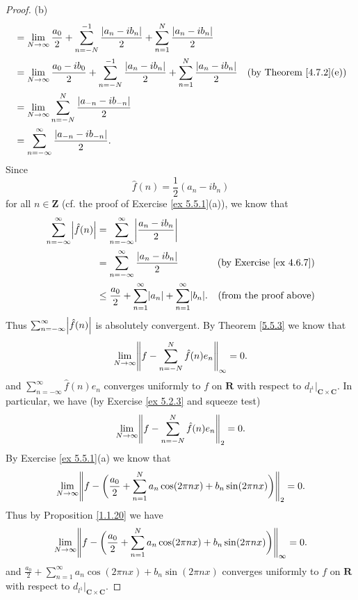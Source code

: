 \begin{proof}{(b)}
\begin{align*}
         & = \lim_{N \to \infty} \frac{a_0}{2} + \sum_{n = -N}^{-1} \frac{\abs*{a_n - i b_n}}{2} + \sum_{n = 1}^N \frac{\abs*{a_n - i b_n}}{2}                                                           \\
         & = \lim_{N \to \infty} \frac{a_0 - i b_0}{2} + \sum_{n = -N}^{-1} \frac{\abs*{a_n - i b_n}}{2} + \sum_{n = 1}^N \frac{\abs*{a_n - i b_n}}{2} & \text{(by Theorem \ref{4.7.2}(e))}              \\
         & = \lim_{N \to \infty} \sum_{n = -N}^N \frac{\abs*{a_{-n} - i b_{-n}}}{2}                                                                                                                      \\
         & = \sum_{n = -\infty}^\infty \frac{\abs*{a_{-n} - i b_{-n}}}{2}.
    \end{align*}
    Since
    \[
        \hat{f}(n) = \frac{1}{2} (a_n - i b_n)
    \]
    for all \(n \in \mathbf{Z}\) (cf. the proof of Exercise \ref{ex 5.5.1}(a)), we know that
    \begin{align*}
        \sum_{n = -\infty}^\infty \abs*{\hat{f}(n)} & = \sum_{n = -\infty}^\infty \abs*{\frac{a_n - i b_n}{2}}                                                                    \\
                                                    & = \sum_{n = -\infty}^\infty \frac{\abs*{a_n - i b_n}}{2}                              & \text{(by Exercise \ref{ex 4.6.7})} \\
                                                    & \leq \frac{a_0}{2} + \sum_{n = 1}^\infty \abs*{a_n} + \sum_{n = 1}^\infty \abs*{b_n}. & \text{(from the proof above)}
    \end{align*}
    Thus \(\sum_{n = -\infty}^\infty \abs*{\hat{f}(n)}\) is absolutely convergent.
    By Theorem \ref{5.5.3} we know that
    \[
        \lim_{N \to \infty} \norm*{f - \sum_{n = -N}^N \hat{f}(n) e_n}_{\infty} = 0.
    \]
    and \(\sum_{n = -\infty}^\infty \hat{f}(n) e_n\) converges uniformly to \(f\) on \(\mathbf{R}\) with respect to \(d_{l^1}|_{\mathbf{C} \times \mathbf{C}}\).
    In particular, we have (by Exercise \ref{ex 5.2.3} and squeeze test)
    \[
        \lim_{N \to \infty} \norm*{f - \sum_{n = -N}^N \hat{f}(n) e_n}_2 = 0.
    \]
    By Exercise \ref{ex 5.5.1}(a) we know that
    \[
        \lim_{N \to \infty} \norm*{f - \bigg(\frac{a_0}{2} + \sum_{n = 1}^N a_n \cos(2 \pi n x) + b_n \sin(2 \pi n x)\bigg)}_2 = 0.
    \]
    Thus by Proposition \ref{1.1.20} we have
    \[
        \lim_{N \to \infty} \norm*{f - \bigg(\frac{a_0}{2} + \sum_{n = 1}^N a_n \cos(2 \pi n x) + b_n \sin(2 \pi n x)\bigg)}_{\infty} = 0.
    \]
    and \(\frac{a_0}{2} + \sum_{n = 1}^\infty a_n \cos(2 \pi n x) + b_n \sin(2 \pi n x)\) converges uniformly to \(f\) on \(\mathbf{R}\) with respect to \(d_{l^1}|_{\mathbf{C} \times \mathbf{C}}\).
\end{proof}

